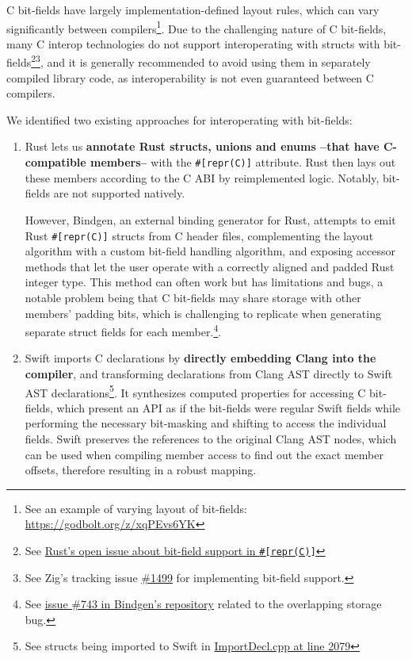 C bit-fields have largely implementation-defined layout rules, which can vary significantly between compilers\footnote{See an example of varying layout of bit-fields: \url{https://godbolt.org/z/xqPEvs6YK}}. Due to the challenging nature of C bit-fields, many C interop technologies do not support interoperating with structs with bit-fields\footnote{See \href{https://github.com/rust-lang/rfcs/issues/314}{Rust's open issue about bit-field support in \texttt{\#[repr(C)]}}}\footnote{See Zig's tracking issue \href{https://github.com/ziglang/zig/issues/1499}{\#1499} for implementing bit-field support.}, and it is generally recommended to avoid using them in separately compiled library code, as interoperability is not even guaranteed between C compilers.

We identified two existing approaches for interoperating with bit-fields:

\begin{enumerate}
    \item Rust lets us \textbf{annotate Rust structs, unions and enums --that have C-compatible members--} with the \texttt{\#[repr(C)]} attribute. Rust then lays out these members according to the C ABI by reimplemented logic\cite{rust-c-layouting}. Notably, bit-fields are not supported natively.
    
    However, Bindgen\cite{rust-bindgen}, an external binding generator for Rust, attempts to emit Rust \texttt{\#[repr(C)]} structs from C header files, complementing the layout algorithm with a custom bit-field handling algorithm, and exposing accessor methods that let the user operate with a correctly aligned and padded Rust integer type. This method can often work but has limitations and bugs, a notable problem being that C bit-fields may share storage with other members' padding bits, which is challenging to replicate when generating separate struct fields for each member.\footnote{See \href{https://github.com/rust-lang/rust-bindgen/issues/743\#issuecomment-321051199}{issue \#743 in Bindgen's repository} related to the overlapping storage bug.}.
    
    \item Swift imports C declarations by \textbf{directly embedding Clang into the compiler}, and transforming declarations from Clang AST directly to Swift AST declarations\footnote{See structs being imported to Swift in \href{https://github.com/swiftlang/swift/blob/9a0a831b0198e1b794a66316487aacef3d692ca4/lib/ClangImporter/ImportDecl.cpp\#L2079}{ImportDecl.cpp at line 2079}}. It synthesizes computed properties for accessing C bit-fields, which present an API as if the bit-fields were regular Swift fields while performing the necessary bit-masking and shifting to access the individual fields\cite{how-swift-imports-c-structs}. Swift preserves the references to the original Clang AST nodes, which can be used when compiling member access to find out the exact member offsets, therefore resulting in a robust mapping.
\end{enumerate}

